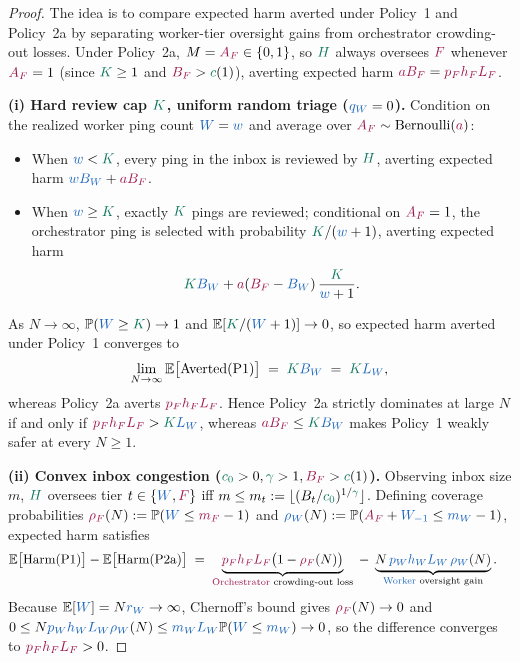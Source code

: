 \documentclass[11pt,reqno]{amsart}
\theoremstyle{spacious}
\newcommand{\Wtxt}[1]{\textcolor{colW}{#1}}
\newcommand{\Ftxt}[1]{\textcolor{colF}{#1}}
\newcommand{\Wv}[1]{{\color{colW}#1}}
\newcommand{\Fv}[1]{{\color{colF}#1}}
\newcommand{\Hv}[1]{{\color{colH}#1}}
\newcommand{\E}{\mathbb{E}}
\newcommand{\Prob}{\mathbb{P}}
\begin{document}
\begin{proof}
The idea is to compare expected harm averted under Policy~1 and Policy~2a by separating \Wtxt{worker}-tier oversight gains from \Ftxt{orchestrator} crowding-out losses. Under Policy~2a, $M = \Fv{A_F} \in \{0,1\}$, so $\Hv{H}$ always oversees $\Fv{F}$ whenever $\Fv{A_F} = 1$ (since $\Hv{K} \ge 1$ and $\Fv{B_F} > \Hv{c}(1)$), averting expected harm $\Fv{a B_F} = \Fv{p_F h_F L_F}$.

\medskip
\noindent\textbf{(i) Hard review cap $\Hv{K}$, uniform random triage ($\Wv{q_W} = 0$).}
Condition on the realized \Wtxt{worker} ping count $\Wv{W} = \Wv{w}$ and average over $\Fv{A_F} \sim \mathrm{Bernoulli}(\Fv{a})$:
\begin{itemize}
  \setlength{\itemsep}{3pt}
  \item When $\Wv{w} < \Hv{K}$, every ping in the inbox is reviewed by $\Hv{H}$, averting expected harm $\Wv{w B_W} + \Fv{a B_F}$.
  \item When $\Wv{w} \ge \Hv{K}$, exactly $\Hv{K}$ pings are reviewed; conditional on $\Fv{A_F} = 1$, the \Ftxt{orchestrator} ping is selected with probability $\Hv{K} / (\Wv{w} + 1)$, averting expected harm
  \[
    \Hv{K} \Wv{B_W} + \Fv{a} (\Fv{B_F} - \Wv{B_W})\,\frac{\Hv{K}}{\Wv{w} + 1}.
  \]
\end{itemize}
As $N \to \infty$, $\Prob(\Wv{W} \ge \Hv{K}) \to 1$ and $\E[\Hv{K} / (\Wv{W} + 1)] \to 0$, so expected harm averted under Policy~1 converges to
\[
  \lim_{N \to \infty} \E\big[\mathrm{Averted}(\mathrm{P1})\big] \;=\; \Hv{K} \Wv{B_W} \;=\; \Hv{K} \Wv{L_W},
\]
whereas Policy~2a averts $\Fv{p_F h_F L_F}$. Hence Policy~2a strictly dominates at large $N$ if and only if $\Fv{p_F h_F L_F} > \Hv{K} \Wv{L_W}$, whereas $\Fv{a B_F} \le \Hv{K} \Wv{B_W}$ makes Policy~1 weakly safer at every $N \ge 1$.

\medskip
\noindent\textbf{(ii) Convex inbox congestion ($\Hv{c_0} > 0, \Hv{\gamma} > 1, \Fv{B_F} > \Hv{c}(1)$).}
Observing inbox size $m$, $\Hv{H}$ oversees tier $t \in \{\Wv{W}, \Fv{F}\}$ iff $m \le m_t := \lfloor (B_t / \Hv{c_0})^{1/\Hv{\gamma}} \rfloor$. Defining coverage probabilities $\Fv{\rho_F}(N) := \Prob(\Wv{W} \le \Fv{m_F} - 1)$ and $\Wv{\rho_W}(N) := \Prob(\Fv{A_F} + \Wv{W_{-1}} \le \Wv{m_W} - 1)$, expected harm satisfies
\begin{align*}
  \E\big[\mathrm{Harm}(\mathrm{P1})\big] - \E\big[\mathrm{Harm}(\mathrm{P2a})\big]
  &\;=\; \underbrace{\Fv{p_F h_F L_F} \big(1 - \Fv{\rho_F}(N)\big)}_{\text{\Ftxt{Orchestrator} crowding-out loss}}
     \;-\; \underbrace{N\,\Wv{p_W h_W L_W}\,\Wv{\rho_W}(N)}_{\text{\Wtxt{Worker} oversight gain}}.
\end{align*}
Because $\E[\Wv{W}] = N \Wv{r_W} \to \infty$, Chernoff's bound gives $\Fv{\rho_F}(N) \to 0$ and $0 \le N \Wv{p_W h_W L_W}\Wv{\rho_W}(N) \le \Wv{m_W L_W}\Prob(\Wv{W} \le \Wv{m_W}) \to 0$, so the difference converges to $\Fv{p_F h_F L_F} > 0$.
\end{proof}
\end{document}
